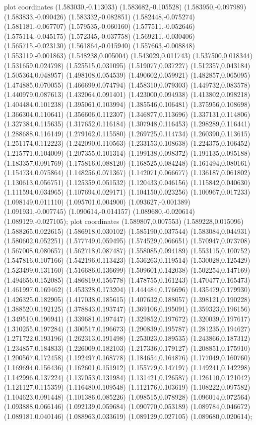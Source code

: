 { plot coordinates {(1.583030,-0.113033) (1.583682,-0.105528) (1.583950,-0.097989) (1.583833,-0.090426) (1.583332,-0.082851) (1.582448,-0.075274) (1.581181,-0.067707) (1.579535,-0.060160) (1.577511,-0.052646) (1.575114,-0.045175) (1.572345,-0.037758) (1.569211,-0.030406) (1.565715,-0.023130) (1.561864,-0.015940) (1.557663,-0.008848) (1.553119,-0.001863) (1.548238,0.005004) (1.543029,0.011743) (1.537500,0.018344) (1.531659,0.024798) (1.525515,0.031095) (1.519077,0.037227) (1.512357,0.043184) (1.505364,0.048957) (1.498108,0.054539) (1.490602,0.059921) (1.482857,0.065095) (1.474885,0.070055) (1.466699,0.074794) (1.458310,0.079303) (1.449732,0.083578) (1.440979,0.087613) (1.432064,0.091401) (1.423000,0.094938) (1.413802,0.098218) (1.404484,0.101238) (1.395061,0.103994) (1.385546,0.106481) (1.375956,0.108698) (1.366304,0.110641) (1.356606,0.112307) (1.346877,0.113696) (1.337131,0.114806) (1.327384,0.115635) (1.317652,0.116184) (1.307948,0.116453) (1.298289,0.116441) (1.288688,0.116149) (1.279162,0.115580) (1.269725,0.114734) (1.260390,0.113615) (1.251174,0.112223) (1.242090,0.110563) (1.233153,0.108638) (1.224375,0.106452) (1.215771,0.104009) (1.207355,0.101314) (1.199138,0.098372) (1.191135,0.095188) (1.183357,0.091769) (1.175816,0.088120) (1.168525,0.084248) (1.161494,0.080161) (1.154734,0.075864) (1.148256,0.071367) (1.142071,0.066677) (1.136187,0.061802) (1.130613,0.056751) (1.125359,0.051532) (1.120433,0.046156) (1.115842,0.040630) (1.111594,0.034965) (1.107694,0.029171) (1.104150,0.023256) (1.100967,0.017233) (1.098149,0.011110) (1.095701,0.004900) (1.093627,-0.001389) (1.091931,-0.007745) (1.090614,-0.014157) (1.089680,-0.020614) (1.089129,-0.027105)};
 plot coordinates {(1.589807,0.007553) (1.589228,0.015096) (1.588265,0.022615) (1.586918,0.030102) (1.585190,0.037544) (1.583084,0.044931) (1.580602,0.052251) (1.577749,0.059495) (1.574529,0.066651) (1.570947,0.073708) (1.567008,0.080657) (1.562718,0.087487) (1.558085,0.094189) (1.553115,0.100752) (1.547816,0.107166) (1.542196,0.113423) (1.536263,0.119514) (1.530028,0.125429) (1.523499,0.131160) (1.516686,0.136699) (1.509601,0.142038) (1.502254,0.147169) (1.494656,0.152085) (1.486819,0.156778) (1.478755,0.161243) (1.470477,0.165473) (1.461997,0.169462) (1.453328,0.173204) (1.444484,0.176696) (1.435479,0.179930) (1.426325,0.182905) (1.417038,0.185615) (1.407632,0.188057) (1.398121,0.190228) (1.388520,0.192125) (1.378843,0.193747) (1.369106,0.195091) (1.359323,0.196156) (1.349510,0.196941) (1.339681,0.197447) (1.329852,0.197672) (1.320039,0.197617) (1.310255,0.197284) (1.300517,0.196673) (1.290839,0.195787) (1.281235,0.194627) (1.271722,0.193196) (1.262313,0.191498) (1.253023,0.189535) (1.243866,0.187312) (1.234857,0.184833) (1.226009,0.182103) (1.217336,0.179127) (1.208851,0.175910) (1.200567,0.172458) (1.192497,0.168778) (1.184654,0.164876) (1.177049,0.160760) (1.169694,0.156436) (1.162601,0.151912) (1.155779,0.147197) (1.149241,0.142298) (1.142996,0.137224) (1.137053,0.131984) (1.131421,0.126587) (1.126110,0.121042) (1.121127,0.115359) (1.116480,0.109548) (1.112176,0.103619) (1.108222,0.097582) (1.104623,0.091448) (1.101386,0.085226) (1.098515,0.078928) (1.096014,0.072564) (1.093888,0.066146) (1.092139,0.059684) (1.090770,0.053189) (1.089784,0.046672) (1.089181,0.040146) (1.088963,0.033619) (1.089129,0.027105) (1.089680,0.020614)};
}
